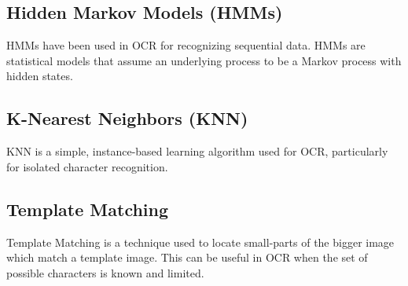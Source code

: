 \subsection{Hidden Markov Models (HMMs)}

HMMs have been used in OCR for recognizing sequential data. HMMs are statistical models that assume an underlying process to be a Markov process with hidden states.

\subsection{K-Nearest Neighbors (KNN)}

KNN is a simple, instance-based learning algorithm used for OCR, particularly for isolated character recognition. \cite{hazraOpticalCharacterRecognition2017}

\subsection{Template Matching}

Template Matching is a technique used to locate small-parts of the bigger image which match a template image. This can be useful in OCR when the set of possible characters is known and limited.

